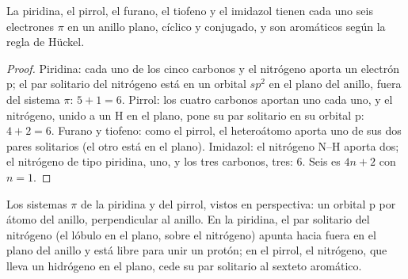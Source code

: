 \begin{proposition}\label{prop:b3:heterocycles:sextet}
La piridina, el pirrol, el furano, el tiofeno y el imidazol tienen cada uno seis electrones $\pi$ en
un anillo plano, cíclico y conjugado, y son aromáticos según la regla de Hückel.
\end{proposition}

\begin{proof}
Piridina: cada uno de los cinco carbonos y el nitrógeno aporta un electrón p; el par
solitario del nitrógeno está en un orbital $sp^2$ en el plano del anillo, fuera del sistema $\pi$: $5 + 1 = 6$.
Pirrol: los cuatro carbonos aportan uno cada uno, y el nitrógeno, unido a un H en el plano,
pone su par solitario en su orbital p: $4 + 2 = 6$. Furano y tiofeno: como el pirrol, el
heteroátomo aporta uno de sus dos pares solitarios (el otro está en el plano). Imidazol:
el nitrógeno N--H aporta dos; el nitrógeno de tipo piridina, uno, y los tres carbonos,
tres: 6. Seis es $4n + 2$ con $n = 1$.
\end{proof}

\begin{omfigure}

{\small Los sistemas $\pi$ de la piridina y del pirrol, vistos en perspectiva: un orbital p por
átomo del anillo, perpendicular al anillo. En la piridina, el par solitario del nitrógeno (el lóbulo en el plano, sobre el
nitrógeno) apunta hacia fuera en el plano del anillo y está libre para unir un protón; en el pirrol,
el nitrógeno, que lleva un hidrógeno en el plano, cede su par solitario al
sexteto aromático.}
\end{omfigure}

